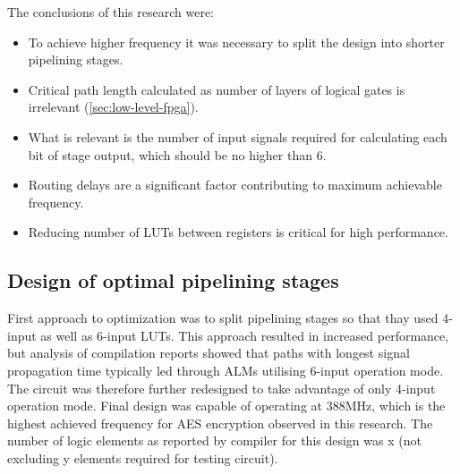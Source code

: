 The conclusions of this research were:
\begin{itemize}
\item To achieve higher frequency it was necessary to split the design into shorter pipelining stages.
\item Critical path length calculated as number of layers of logical gates is irrelevant (\ref{sec:low-level-fpga}).
\item What is relevant is the number of input signals required for calculating each bit of stage output, which should be no higher than 6.
\item Routing delays are a significant factor contributing to maximum achievable frequency.
\item Reducing number of LUTs between registers is critical for high performance.
\end{itemize}








\subsection{Design of optimal pipelining stages}
\label{sec:pipeline-stages-design}

First approach to optimization was to split pipelining stages so that thay used 4-input as well as 6-input LUTs. This approach resulted in increased performance, but analysis of compilation reports showed that paths with longest signal propagation time typically led through ALMs utilising 6-input operation mode. The circuit was therefore further redesigned to take advantage of only 4-input operation mode. Final design was capable of operating at 388MHz, which is the highest achieved frequency for AES encryption observed in this research. The number of logic elements as reported by compiler for this design was x (not excluding y elements required for testing circuit).

